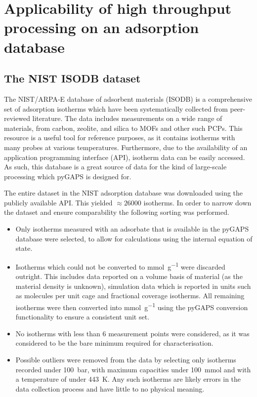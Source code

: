 
\section{Applicability of high throughput processing on an adsorption database}

\subsection{The NIST ISODB dataset}

The NIST/ARPA-E database of adsorbent materials (ISODB) is a comprehensive
set of adsorption isotherms which have been systematically
collected from peer-reviewed literature. The data includes 
measurements on a wide range of materials, from carbon, zeolite,
and silica to MOFs and other such PCPs. This resource is a useful
tool for reference purposes, as it contains isotherms with many probes
at various temperatures. Furthermore, due to the availability of an 
application programming interface (API), isotherm data can be easily
accessed. As such, this database is a great 
source of data for the kind of large-scale processing which pyGAPS
is designed for.

The entire dataset in the NIST adsorption database was downloaded using the
publicly available API. This yielded \(\approx \! 26000\) isotherms.
In order to narrow down the dataset and ensure comparability
the following sorting was performed.

\begin{itemize}
    \item Only isotherms measured with an adsorbate that is available
    in the pyGAPS database were selected, to allow for calculations
    using the internal equation of state.
    \item Isotherms which could not be converted to \si{\milli\mol\per\gram}
    were discarded outright. This includes data reported 
    on a volume basis of material (as the material density is 
    unknown), simulation data which is reported in units such 
    as molecules per unit cage and fractional coverage isotherms.
    All remaining isotherms were then converted into 
    \si{\milli\mol\per\gram} using the pyGAPS conversion 
    functionality to ensure a consistent unit set.
    \item No isotherms with less than 6 measurement points were 
    considered, as it was considered to be the bare 
    minimum required for characterisation.
    \item Possible outliers were removed from the data by selecting 
    only isotherms recorded under \SI{100}{\bar}, with maximum capacities
    under \SI{100}{\milli\mol} and with a temperature of under 
    \SI{443}{\kelvin}. Any such isotherms are likely errors in the 
    data collection process and have little to no physical meaning.
\end{itemize}

